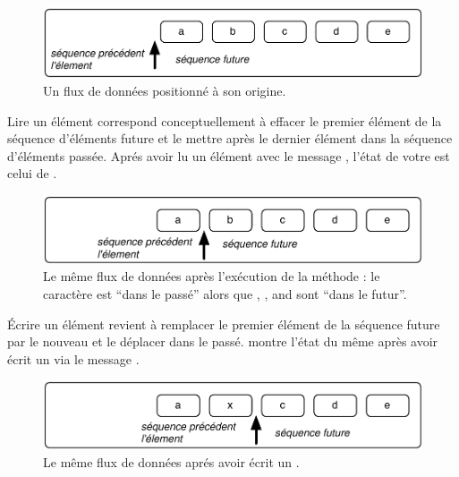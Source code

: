 \documentclass[a4paper,10pt,twoside]{book}
\begin{document}
\begin{figure}[ht]
\centerline{\includegraphics[scale=0.5]{_abcdeStef}}
\caption{Un flux de donn\'ees positionn\'e \`a son origine.}
\label{fig:_abcde}
\vspace{.2in}
\end{figure}

Lire un \'el\'ement correspond conceptuellement \`a effacer le premier \'el\'ement de la s\'equence d'\'el\'ements future et le mettre apr\`es le dernier \'el\'ement dans la s\'equence d'\'el\'ements pass\'ee.
Apr\'es avoir lu un \'el\'ement avec le message , l'\'etat de votre \stream est celui de .

\begin{figure}[ht]
\centerline{\includegraphics[scale=0.5]{a_bcdeStef}}
\caption{Le m\^eme flux de donn\'ees apr\`es l'ex\'ecution de la m\'ethode : le caract\`ere  est ``dans le pass\'e'' alors que , ,  and  sont ``dans le futur''.}
\label{fig:a_bcde}
\vspace{.2in}
\end{figure}

\'Ecrire un \'el\'ement revient \`a remplacer le premier \'el\'ement de la s\'equence future par le nouveau et le d\'eplacer dans le pass\'e.  montre l'\'etat du m\^eme \stream apr\`es avoir \'ecrit un  via le message  .

\begin{figure}[h!t]
\centerline{\includegraphics[scale=0.5]{ax_cdeStef}}
\caption{Le m\^eme flux de donn\'ees apr\'es avoir \'ecrit un .}
\label{fig:ax_cde}
\vspace{.2in}
\end{figure}
\end{document}
